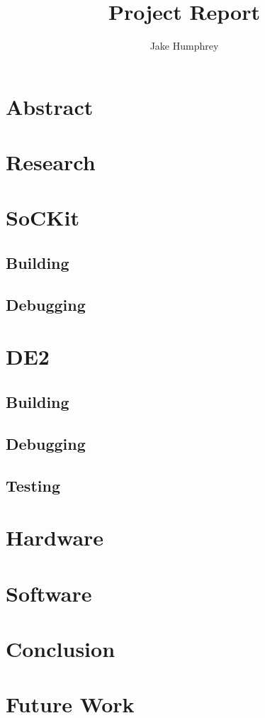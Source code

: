 \documentclass[11pt]{article} %
\title{Project Report}
\author{Jake Humphrey}
\begin{document}
\maketitle

\section{Abstract}
\section{Research}
\section{SoCKit}
\subsection{Building}
\subsection{Debugging}
\section{DE2}
\subsection{Building}
\subsection{Debugging}
\subsection{Testing}
\section{Hardware}
\section{Software}
\section{Conclusion}
\section{Future Work}
\end{document}
